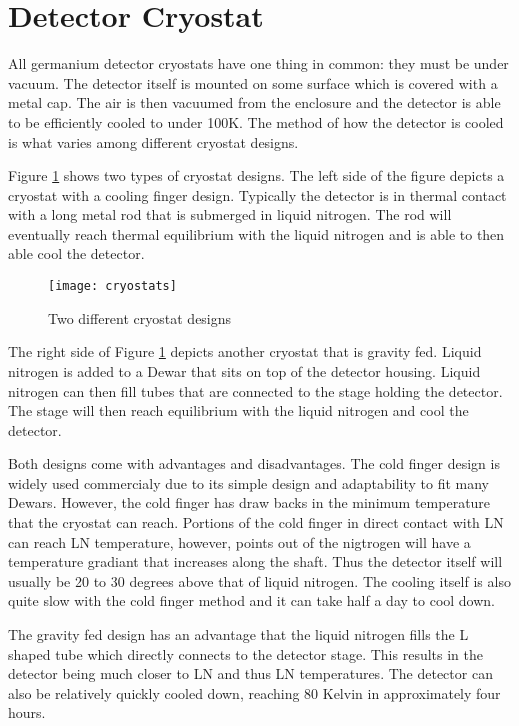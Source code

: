 \section{Detector Cryostat}
All germanium detector cryostats have one thing in common: they must be under vacuum.
The detector itself is mounted on some surface which is covered with a metal cap.
The air is then vacuumed from the enclosure and the detector is able to be efficiently cooled to under 100K.
The method of how the detector is cooled is what varies among different cryostat designs.

Figure \ref{fig:cryostats} shows two types of cryostat designs.
The left side of the figure depicts a cryostat with a cooling finger design.
Typically the detector is in thermal contact with a long metal rod that is submerged in liquid nitrogen.
The rod will eventually reach thermal equilibrium with the liquid nitrogen and is able to then able cool the detector.
\begin{figure}[htpb]
\centering
\texttt{[image: cryostats]}
\caption{Two different cryostat designs}
\label{fig:cryostats}
\end{figure}
The right side of Figure \ref{fig:cryostats} depicts another cryostat that is gravity fed.
Liquid nitrogen is added to a Dewar that sits on top of the detector housing.
Liquid nitrogen can then fill tubes that are connected to the stage holding the detector.
The stage will then reach equilibrium with the liquid nitrogen and cool the detector.

Both designs come with advantages and disadvantages.
The cold finger design is widely used commercialy due to its simple design and adaptability to fit many Dewars.
However, the cold finger has draw backs in the minimum temperature that the cryostat can reach.
Portions of the cold finger in direct contact with LN can reach LN temperature, however, points out of the nigtrogen will have a temperature gradiant that increases along the shaft.
Thus the detector itself will usually be 20 to 30 degrees above that of liquid nitrogen.
The cooling itself is also quite slow with the cold finger method and it can take half a day to cool down.

The gravity fed design has an advantage that the liquid nitrogen fills the L shaped tube which directly connects to the detector stage.
This results in the detector being much closer to LN  and thus LN temperatures.
The detector can also be relatively quickly cooled down, reaching 80 Kelvin in approximately four hours.


